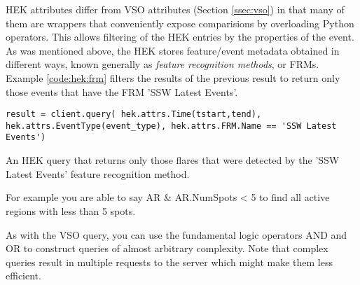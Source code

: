 HEK attributes differ from VSO attributes (Section \ref{ssec:vso}) in
that many of them are wrappers that conveniently expose
comparisions by overloading Python operators.  This allows filtering
of the HEK entries by the properties of the event.  As was mentioned
above, the HEK stores feature/event metadata obtained in different
ways, known generally as {\it feature recognition methods}, or FRMs.
Example \ref{code:hek:frm} filters the results of the previous result
to return only those events that have the FRM 'SSW Latest Events'.
\begin{listing}
\begin{verbatim}
result = client.query( hek.attrs.Time(tstart,tend), hek.attrs.EventType(event_type), hek.attrs.FRM.Name == 'SSW Latest Events')
\end{verbatim}
\caption{An HEK query that returns only those flares that were
  detected by the 'SSW Latest Events' feature recognition method.}
\label{code:hek:frm}
\end{listing}




For example you are able
to say AR & AR.NumSpots < 5 to find all active regions with less than
5 spots. 


As with the VSO query, you can use the fundamental logic
operators AND and OR to construct queries of almost arbitrary
complexity. Note that complex queries result in multiple requests to
the server which might make them less efficient.

